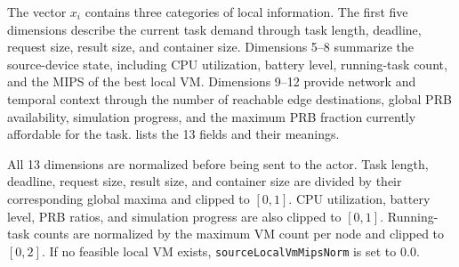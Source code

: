 The vector \(x_i\) contains three categories of local information. The first five dimensions describe the current task demand through task length, deadline, request size, result size, and container size. Dimensions 5--8 summarize the source-device state, including CPU utilization, battery level, running-task count, and the MIPS of the best local VM. Dimensions 9--12 provide network and temporal context through the number of reachable edge destinations, global PRB availability, simulation progress, and the maximum PRB fraction currently affordable for the task.  lists the 13 fields and their meanings.

All 13 dimensions are normalized before being sent to the actor. Task length, deadline, request size, result size, and container size are divided by their corresponding global maxima and clipped to \([0,1]\). CPU utilization, battery level, PRB ratios, and simulation progress are also clipped to \([0,1]\). Running-task counts are normalized by the maximum VM count per node and clipped to \([0,2]\). If no feasible local VM exists, \texttt{sourceLocalVmMipsNorm} is set to \(0.0\).

